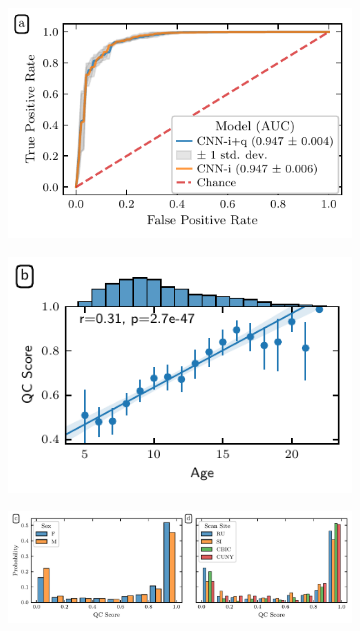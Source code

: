 \documentclass[9pt,lineno]{elife}
\begin{document}
\begin{figure}[tbp]
    {\label{fig:dl-qc:roc}}
    {\label{fig:dl-qc:joint}}
    {\label{fig:dl-qc:hist:sex}}
    {\label{fig:dl-qc:hist:site}}
    \begin{subfigure}{.5\linewidth}
    \centering
    \includegraphics[width=\linewidth]{deep-learning-qc/dl_roc_auc_curve.pdf}
    \end{subfigure}
    \begin{subfigure}{.5\linewidth}
    \centering
    \includegraphics[width=\linewidth]{bundle-profiles/qc-age-jointplot.pdf}
    \end{subfigure}
    \begin{subfigure}{\linewidth}
    \centering
    \includegraphics[width=\linewidth]{bundle-profiles/qc-hist.pdf}

\end{subfigure}
\end{figure}
\end{document}
